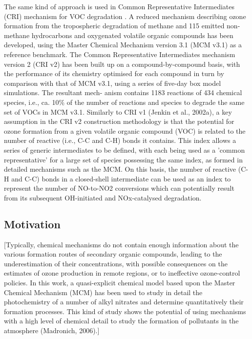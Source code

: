 \documentclass[11pt,a4paper]{article}
\begin{document}
The same kind of approach is used in Common Representative Intermediates (CRI) mechanism for VOC degradation \citep{Jenkin2002, Jenkin2008}.
A reduced mechanism describing ozone formation from the tropospheric degradation of methane and 115 emitted non-methane hydrocarbons and oxygenated volatile organic compounds has been developed, using the Master Chemical Mechanism version 3.1 (MCM v3.1) as a reference benchmark. The Common Representative Intermediates mechanism version 2 (CRI v2) has been built up on a compound-by-compound basis, with the performance of its chemistry optimised for each compound in turn by comparison with that of MCM v3.1, using a series of five-day box model simulations. The resultant mech- anism contains 1183 reactions of 434 chemical species, i.e., ca. 10\% of the number of reactions and species to degrade the same set of VOCs in MCM v3.1. Similarly to CRI v1 (Jenkin et al., 2002a), a key assumption in the CRI v2 construction methodology is that the potential for ozone formation from a given volatile organic compound (VOC) is related to the number of reactive (i.e., C-C and C-H) bonds it contains. This index allows a series of generic intermediates to be defined, with each being used as a 'common representative' for a large set of species possessing the same index, as formed in detailed mechanisms such as the MCM.
On this basis, the number of reactive (C-H and C-C)
bonds in a closed-shell intermediate can be used as an index to represent the number of NO-to-NO2 conversions which can potentially result from its subsequent OH-initiated and NOx-catalysed degradation.

\subsection{Motivation}
\citep{Sommariva2008}
[Typically, chemical mechanisms do not contain
enough information about the various formation routes of secondary organic compounds, leading to the underestimation of their concentrations, with possible consequences on the estimates of ozone production in remote regions, or to ineffective ozone-control policies. In this work, a quasi-explicit chemical model based upon the Master Chemical Mechanism (MCM) has been used to study in detail the photochemistry of a number of alkyl nitrates and determine quantitatively their formation processes. This kind of study shows the potential of using mechanisms with a high level of chemical detail to study the formation of pollutants in the atmosphere (Madronich, 2006).]
\end{document}
